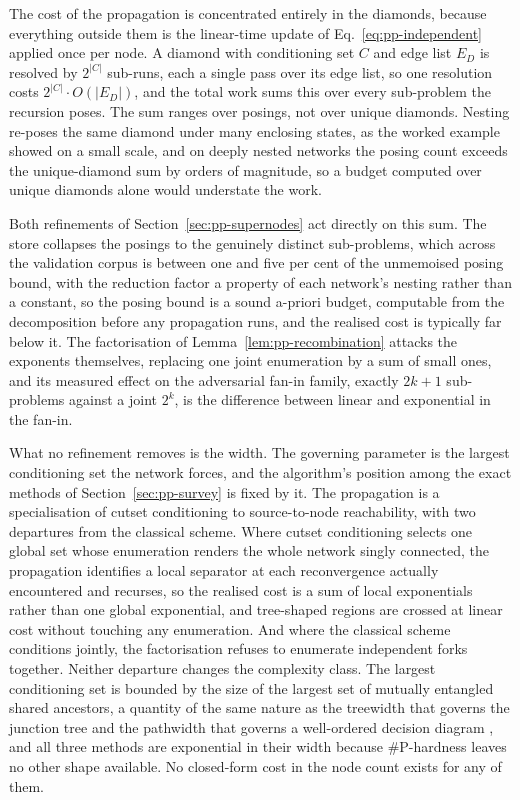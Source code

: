 \documentclass[12pt]{report}
\begin{document}
The cost of the propagation is concentrated entirely in the diamonds, because everything outside them is the linear-time update of Eq.~\eqref{eq:pp-independent} applied once per node. A diamond with conditioning set $C$ and edge list $E_D$ is resolved by $2^{|C|}$ sub-runs, each a single pass over its edge list, so one resolution costs $2^{|C|} \cdot O(|E_D|)$, and the total work sums this over every sub-problem the recursion poses. The sum ranges over posings, not over unique diamonds. Nesting re-poses the same diamond under many enclosing states, as the worked example showed on a small scale, and on deeply nested networks the posing count exceeds the unique-diamond sum by orders of magnitude, so a budget computed over unique diamonds alone would understate the work.

Both refinements of Section~\ref{sec:pp-supernodes} act directly on this sum. The store collapses the posings to the genuinely distinct sub-problems, which across the validation corpus is between one and five per cent of the unmemoised posing bound, with the reduction factor a property of each network's nesting rather than a constant, so the posing bound is a sound a-priori budget, computable from the decomposition before any propagation runs, and the realised cost is typically far below it. The factorisation of Lemma~\ref{lem:pp-recombination} attacks the exponents themselves, replacing one joint enumeration by a sum of small ones, and its measured effect on the adversarial fan-in family, exactly $2k+1$ sub-problems against a joint $2^k$, is the difference between linear and exponential in the fan-in.

What no refinement removes is the width. The governing parameter is the largest conditioning set the network forces, and the algorithm's position among the exact methods of Section~\ref{sec:pp-survey} is fixed by it. The propagation is a specialisation of cutset conditioning \cite{pearl1988probabilistic} to source-to-node reachability, with two departures from the classical scheme. Where cutset conditioning selects one global set whose enumeration renders the whole network singly connected, the propagation identifies a local separator at each reconvergence actually encountered and recurses, so the realised cost is a sum of local exponentials rather than one global exponential, and tree-shaped regions are crossed at linear cost without touching any enumeration. And where the classical scheme conditions jointly, the factorisation refuses to enumerate independent forks together. Neither departure changes the complexity class. The largest conditioning set is bounded by the size of the largest set of mutually entangled shared ancestors, a quantity of the same nature as the treewidth that governs the junction tree \cite{lauritzen1988local} and the pathwidth that governs a well-ordered decision diagram \cite{bryant1986graph}, and all three methods are exponential in their width because \#P-hardness leaves no other shape available. No closed-form cost in the node count exists for any of them.
\end{document}
